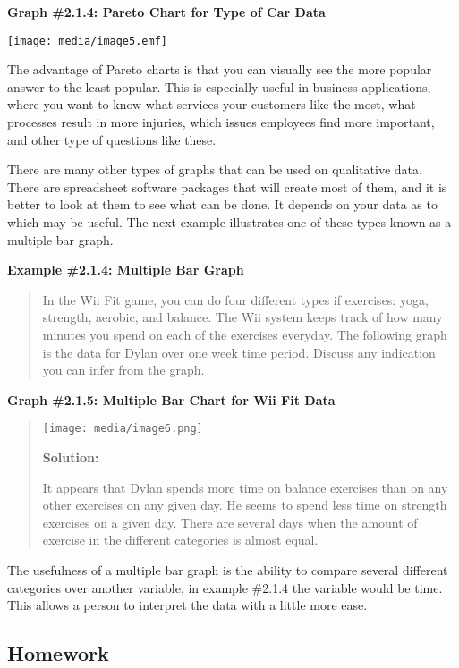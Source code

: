 \documentclass[]{book}
\begin{document}
\textbf{Graph \#2.1.4: Pareto Chart for Type of Car Data}

\texttt{[image: media/image5.emf]}

The advantage of Pareto charts is that you can visually see the more
popular answer to the least popular. This is especially useful in
business applications, where you want to know what services your
customers like the most, what processes result in more injuries, which
issues employees find more important, and other type of questions like
these.

There are many other types of graphs that can be used on qualitative
data. There are spreadsheet software packages that will create most of
them, and it is better to look at them to see what can be done. It
depends on your data as to which may be useful. The next example
illustrates one of these types known as a multiple bar graph.

\textbf{Example \#2.1.4: Multiple Bar Graph}

\begin{quote}
In the Wii Fit game, you can do four different types if exercises:
yoga, strength, aerobic, and balance. The Wii system keeps track of
how many minutes you spend on each of the exercises everyday. The
following graph is the data for Dylan over one week time period.
Discuss any indication you can infer from the graph.
\end{quote}

\textbf{Graph \#2.1.5: Multiple Bar Chart for Wii Fit Data}

\begin{quote}
\texttt{[image: media/image6.png]}

\textbf{Solution:}

It appears that Dylan spends more time on balance exercises than on
any other exercises on any given day. He seems to spend less time on
strength exercises on a given day. There are several days when the
amount of exercise in the different categories is almost equal.
\end{quote}

The usefulness of a multiple bar graph is the ability to compare several
different categories over another variable, in example \#2.1.4 the
variable would be time. This allows a person to interpret the data with
a little more ease.

\hypertarget{homework-4}{%
\subsection{Homework}\label{homework-4}}
\end{document}
